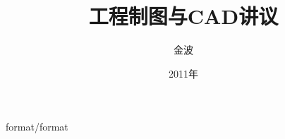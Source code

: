 \documentclass[12pt,twoside]{book}
\begin{document}
\begin{CJK}{UTF8}{song}
 {format/format}
\title{工程制图与CAD讲议}
\author{金波}
\date{2011年}
\maketitle
\CJKtilde
\frontmatter
\tableofcontents
\mainmatter
\graphicspath{{cad/pdf/}{cad/png/}}





%
%
%

\newpage
\end{CJK}
\end{document}
